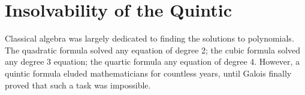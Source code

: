 \chapter{Insolvability of the Quintic}
Classical algebra was largely dedicated to finding the solutions to polynomials. The quadratic formula solved any equation of degree 2; the cubic formula solved any degree 3 equation; the quartic formula any equation of degree 4. However, a quintic formula eluded mathematicians for countless years, until Galois finally proved that such a task was impossible.

